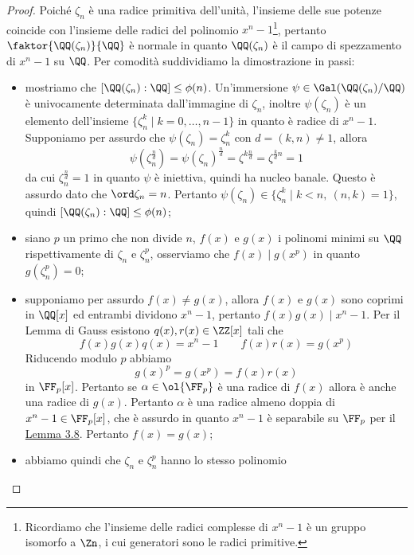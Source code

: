\documentclass[11pt]{scrartcl}
\begin{document}
\begin{proof}
    Poiché $\zeta_n$ è una radice primitiva dell'unità, l'insieme delle sue 
    potenze coincide con l'insieme delle radici del polinomio $x^n - 1$\footnote{
        Ricordiamo che l'insieme delle radici complesse di $x^n -1$ è un gruppo 
        isomorfo a $\Zn$, i cui generatori sono le radici primitive.
    },
    pertanto $\faktor{\QQ(\zeta_n)}{\QQ}$ è normale in quanto $\QQ(\zeta_n)$
    è il campo di spezzamento di $x^n - 1$ su $\QQ$. Per comodità suddividiamo 
    la dimostrazione in passi:
    \begin{itemize}
        \item mostriamo che $[\QQ(\zeta_n):\QQ] \leq \phi(n)$. Un'immersione
        $\psi \in \Gal(\QQ(\zeta_n)/\QQ)$ è univocamente determinata dall'immagine
        di $\zeta_n$, inoltre $\psi(\zeta_n)$ è un elemento dell'insieme 
        $\{\zeta_n^k\mid k = 0, \ldots, n - 1\}$ in quanto è radice di $x^n - 1$.
        Supponiamo per assurdo che $\psi(\zeta_n) = \zeta_n^k$ con $d = (k, n)\neq 1$, 
        allora
        \[
            \psi(\zeta_n^{\frac n d}) = \psi(\zeta_n)^{\frac n d} = \zeta^{k\frac n d} = 
            \zeta^{\frac k d n} = 1
        \]
        da cui $\zeta_n^{\frac n d} = 1$ in quanto $\psi$ è iniettiva, quindi ha 
        nucleo banale. Questo è assurdo dato che $\ord \zeta_n = n$.
        Pertanto $\psi(\zeta_n) \in \{\zeta_n^k\mid k < n,~(n, k) = 1\}$, quindi
        $[\QQ(\zeta_n):\nolinebreak\QQ] \leq \phi(n)$;
        \item siano $p$ un primo che non divide $n$, $f(x)$ e $g(x)$ i polinomi 
        minimi su $\QQ$ rispettivamente di $\zeta_n$ e $\zeta_n^p$, osserviamo
        che $f(x) \mid g(x^p)$ in quanto $g(\zeta_n^p) = 0$;
        \item supponiamo per assurdo $f(x) \neq g(x)$, allora $f(x)$ e $g(x)$
        sono coprimi in $\QQ[x]$ ed entrambi dividono $x^n - 1$, pertanto $f(x)g(x) \mid x^n -1$.
        Per il Lemma di Gauss esistono $q(x), r(x) \in \ZZ[x]$ tali che 
        \[
            f(x)g(x)q(x) = x^n - 1\qquad f(x)r(x) = g(x^p)
        \]
        Riducendo modulo $p$ abbiamo 
        \[
            g(x)^p = g(x^p) = f(x)r(x)
        \]
        in $\FF_p[x]$. Pertanto se $\alpha \in \ol{\FF_p}$ è una radice di $f(x)$
        allora è anche una radice di $g(x)$. Pertanto $\alpha$ è una radice
        almeno doppia di $x^n - 1 \in \FF_p[x]$, che è assurdo in quanto $x^n -1$
        è separabile su $\FF_p$ per il \hyperref[lemma3.8]{Lemma 3.8}. Pertanto 
        $f(x) = g(x)$;
        \item abbiamo quindi che $\zeta_n$ e $\zeta_n^p$ hanno lo stesso polinomio 

\end{itemize}
\end{proof}
\end{document}
